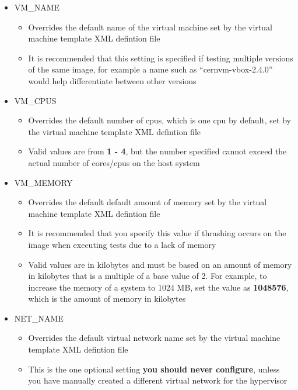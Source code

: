\begin{itemize}
\item	VM\_NAME
		\begin{itemize}
		\item	Overrides the default name of the virtual machine set by the 
				virtual machine template XML defintion file
		\item	It is recommended that this setting is specified if testing multiple
				versions of the same \cernvm image, for example a name such as
				``cernvm-vbox-2.4.0'' would help differentiate between other versions
		\end{itemize}
		
\item	VM\_CPUS
		\begin{itemize}
		\item	Overrides the default number of cpus, which is one cpu by default,
				set by the virtual machine template XML defintion file
		\item	Valid values are from {\bf 1 - 4}, but the number specified cannot
				exceed the actual number of cores/cpus on the host system
		\end{itemize}
	
\item	VM\_MEMORY
		\begin{itemize}
		\item	Overrides the default default amount of memory set by the virtual machine
				template XML defintion file
		\item	It is recommended that you specify this value if thrashing occurs on the
				\cernvm image when executing tests due to a lack of memory
		\item	Valid values are in kilobytes and must be based on an amount of memory in
				kilobytes that is a multiple of a base value of 2. For example, to increase
				the memory of a system to 1024 MB, set the value as {\bf 1048576}, which is the
				amount of memory in kilobytes
		\end{itemize}

\item	NET\_NAME
		\begin{itemize}
		\item	Overrides the default virtual network name set by the virtual machine
				template XML defintion file
		\item	This is the one optional setting {\bf you should never configure}, unless you have
	  			manually created a different virtual network for the hypervisor
		\end{itemize}


\end{itemize}
